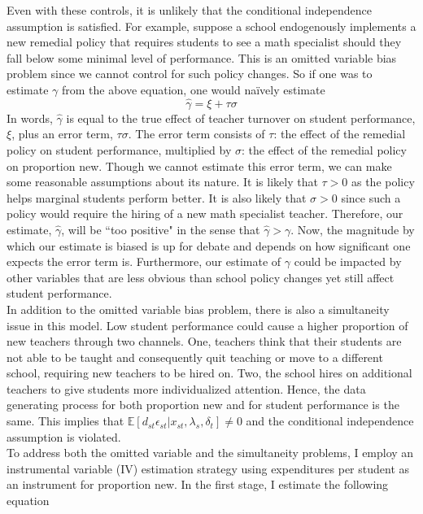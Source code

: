 \documentclass[12pt]{report}
\begin{document}
\indent Even with these controls, it is unlikely that the conditional independence assumption is satisfied. For example, suppose a school endogenously implements a new remedial policy that requires students to see a math specialist should they fall below some minimal level of performance. This is an omitted variable bias problem since we cannot control for such policy changes. So if one was to estimate $\gamma$ from the above equation, one would na\"{i}vely estimate 
\begin{equation}
\hat{\gamma}=\xi+\tau\sigma
\end{equation}
\noindent In words, $\hat{\gamma}$ is equal to the true effect of teacher turnover on student performance, $\xi$, plus an error term, $\tau\sigma$. The error term consists of $\tau$: the effect of the remedial policy on student performance, multiplied by $\sigma$: the effect of the remedial policy on proportion new. Though we cannot estimate this error term, we can make some reasonable assumptions about its nature. It is likely that $\tau>0$ as the policy helps marginal students perform better. It is also likely that $\sigma>0$ since such a policy would require the hiring of a new math specialist teacher. Therefore, our estimate, $\hat{\gamma}$, will be ``too positive" in the sense that $\hat\gamma >\gamma$. Now, the magnitude by which our estimate is biased is up for debate and depends on how significant one expects the error term is. Furthermore, our estimate of $\gamma$ could be impacted by other variables that are less obvious than school policy changes yet still affect student performance. \\
\indent In addition to the omitted variable bias problem, there is also a simultaneity issue in this model. Low student performance could cause a higher proportion of new teachers through two channels. One, teachers think that their students are not able to be taught and consequently quit teaching or move to a different school, requiring new teachers to be hired on. Two, the school hires on additional teachers to give students more individualized attention. Hence, the data generating process for both proportion new and for student performance is the same. This implies that $\mathbb{E}[d_{st}\epsilon_{st}|x_{st},\lambda_s,\delta_t]\not=0$ and the conditional independence assumption is violated. \\
\indent To address both the omitted variable and the simultaneity problems, I employ an instrumental variable (IV) estimation strategy using expenditures per student as an instrument for proportion new. In the first stage, I estimate the following equation
\end{document}
